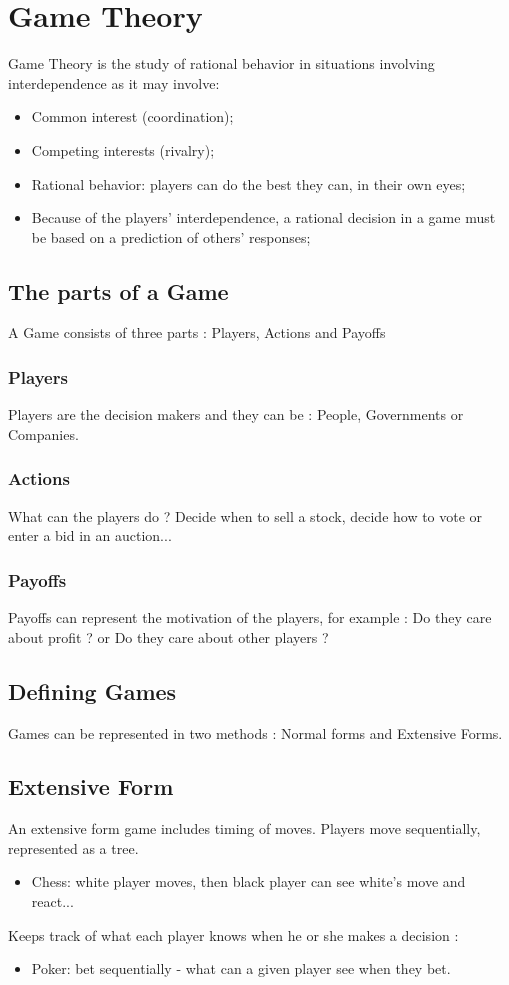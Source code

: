 \section{Game Theory}
Game Theory is the study of rational behavior in situations involving interdependence as it may involve:
\begin{itemize}
\item Common interest (coordination);
\item Competing interests (rivalry);
\item Rational behavior: players can do the best they can, in their own eyes;
\item Because of the players' interdependence, a rational decision in a game must be based on a prediction of others' responses;
\end{itemize}
\subsection{The parts of a Game} 
A Game consists of three parts : 
Players, Actions and Payoffs
\subsubsection{Players}
Players are the decision makers and they can be : People, Governments or Companies.
\subsubsection{Actions}
What can the players do ?
Decide when to sell a stock, decide how to vote or enter a bid in an auction...
\subsubsection{Payoffs}
Payoffs can represent the motivation of the players, for example : Do they care about profit ? or Do they care about other players ? 
\subsection{Defining Games} Games can be represented in two methods : Normal forms and Extensive Forms.
\subsection{Extensive Form}
An extensive form game includes timing of moves. 
Players move sequentially, represented as a tree.
\begin{itemize}
\item Chess: white player moves, then black player can see white's move and react...
\end{itemize}
Keeps track of what each player knows when he or she makes a decision :
\begin{itemize}
\item Poker: bet sequentially - what can a given player see when they bet. 
\end{itemize}
